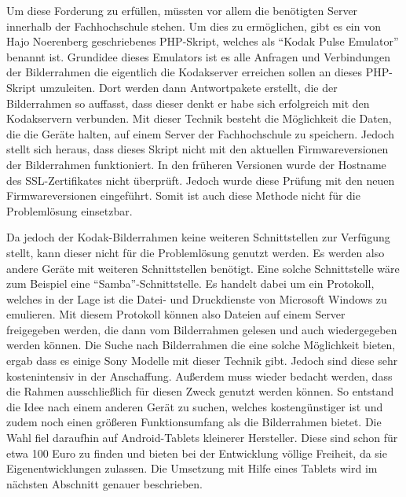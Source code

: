 \begin{flushleft}
Um diese Forderung zu erfüllen, müssten vor allem die benötigten Server innerhalb der Fachhochschule stehen. Um dies zu ermöglichen, gibt es ein von Hajo Noerenberg geschriebenes PHP-Skript, welches als ``Kodak Pulse Emulator'' benannt ist. Grundidee dieses Emulators ist es alle Anfragen und Verbindungen der Bilderrahmen die eigentlich die Kodakserver erreichen sollen an dieses PHP-Skript umzuleiten. Dort werden dann Antwortpakete erstellt, die der Bilderrahmen so auffasst, dass dieser denkt er habe sich erfolgreich mit den Kodakservern verbunden. Mit dieser Technik besteht die Möglichkeit die Daten, die die Geräte halten, auf einem Server der Fachhochschule zu speichern. 
Jedoch stellt sich heraus, dass dieses Skript nicht mit den aktuellen Firmwareversionen der Bilderrahmen funktioniert. In den früheren Versionen wurde der Hostname des SSL-Zertifikates nicht überprüft. Jedoch wurde diese Prüfung mit den neuen Firmwareversionen eingeführt. Somit ist auch diese Methode nicht für die Problemlösung einsetzbar. 

Da jedoch der Kodak-Bilderrahmen keine weiteren Schnittstellen zur Verfügung stellt, kann dieser nicht für die Problemlösung genutzt werden. Es werden also andere Geräte mit weiteren Schnittstellen benötigt. Eine solche Schnittstelle wäre zum Beispiel eine ``Samba''-Schnittstelle. Es handelt dabei um ein Protokoll, welches in der Lage ist die Datei- und Druckdienste von Microsoft Windows zu emulieren. Mit diesem Protokoll können also Dateien auf einem Server freigegeben werden, die dann vom Bilderrahmen gelesen und auch wiedergegeben werden können. Die Suche nach Bilderrahmen die eine solche Möglichkeit bieten, ergab dass es einige Sony Modelle mit dieser Technik gibt. Jedoch sind diese sehr kostenintensiv in der Anschaffung. Außerdem muss wieder bedacht werden, dass die Rahmen ausschließlich für diesen Zweck genutzt werden können. 
So entstand die Idee nach einem anderen Gerät zu suchen, welches kostengünstiger ist und zudem noch einen größeren Funktionsumfang als die Bilderrahmen bietet. Die Wahl fiel daraufhin auf Android-Tablets kleinerer Hersteller. Diese sind schon für etwa 100 Euro zu finden und bieten bei der Entwicklung völlige Freiheit, da sie Eigenentwicklungen zulassen. 
Die Umsetzung mit Hilfe eines Tablets wird im nächsten Abschnitt genauer beschrieben. 


\end{flushleft}
